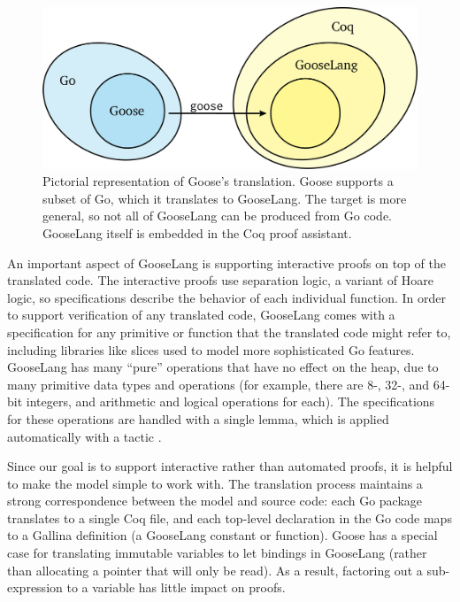 \begin{figure}
  \centering
  \includegraphics{fig/goose.png}
  \caption[Representation of Goose's translation support]%
  {Pictorial representation of Goose's translation. Goose supports a subset of
    Go, which it translates to GooseLang. The target is more general, so not all
    of GooseLang can be produced from Go code. GooseLang itself is embedded in
    the Coq proof assistant.}
  \label{fig:goose:overview}
\end{figure}

An important aspect of GooseLang is supporting interactive proofs on top
of the translated code. The interactive proofs use separation logic, a
variant of Hoare logic, so specifications describe the behavior of each
individual function. In order to support verification of any translated
code, GooseLang comes with a specification for any primitive or function
that the translated code might refer to, including libraries like slices
used to model more sophisticated Go features. GooseLang has many
``pure'' operations that have no effect on the heap, due to many
primitive data types and operations (for example, there are 8-,
32-, and 64-bit integers, and arithmetic and logical operations for
each). The specifications for these operations are handled with a single
lemma, which is applied automatically with a tactic .

Since our goal is to support interactive rather than automated proofs,
it is helpful to make the model simple to work with. The translation process maintains
a strong correspondence between the model and source code: each Go
package translates to a single Coq file, and each top-level declaration
in the Go code maps to a Gallina definition (a GooseLang constant or
function). Goose has a special case for translating immutable variables
to let bindings in GooseLang (rather than allocating a pointer that will
only be read). As a result, factoring out a sub-expression to a variable
has little impact on proofs.

